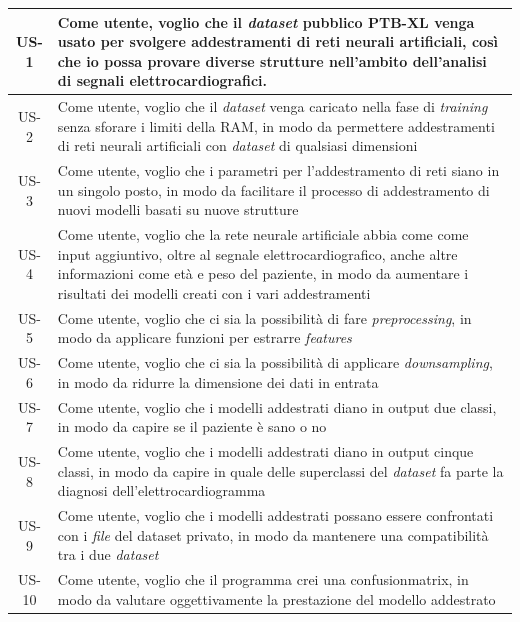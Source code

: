 \begin{center}
\begin{longtable}{|p{2.5cm}|p{10.5cm}|}
    \multicolumn{1}{|c|}{US-1} & Come utente, voglio che il \textit{dataset} pubblico PTB-XL venga usato per svolgere addestramenti di reti neurali artificiali, così che io possa provare diverse strutture nell'ambito dell'analisi di segnali elettrocardiografici. \\
    \hline
    \multicolumn{1}{|c|}{US-2} & Come utente, voglio che il \textit{dataset} venga caricato nella fase di \textit{training} senza sforare i limiti della RAM, in modo da permettere addestramenti di reti neurali artificiali con \textit{dataset} di qualsiasi dimensioni \\
    \hline
    \multicolumn{1}{|c|}{US-3} & Come utente, voglio che i parametri per l'addestramento di reti siano in un singolo posto, in modo da facilitare il processo di addestramento di nuovi modelli basati su nuove strutture \\
    \hline
    \multicolumn{1}{|c|}{US-4} & Come utente, voglio che la rete neurale artificiale abbia come come input aggiuntivo, oltre al segnale elettrocardiografico, anche altre informazioni come età e peso del paziente, in modo da aumentare i risultati dei modelli creati con i vari addestramenti \\
    \hline
    \multicolumn{1}{|c|}{US-5} & Come utente, voglio che ci sia la possibilità di fare \textit{preprocessing}, in modo da applicare funzioni per estrarre \textit{features} \\
    \hline
    \multicolumn{1}{|c|}{US-6} & Come utente, voglio che ci sia la possibilità di applicare \textit{downsampling}, in modo da ridurre la dimensione dei dati in entrata \\
    \hline
    \multicolumn{1}{|c|}{US-7} & Come utente, voglio che i modelli addestrati diano in output due classi, in modo da capire se il paziente è sano o no \\
    \hline
    \multicolumn{1}{|c|}{US-8} & Come utente, voglio che i modelli addestrati diano in output cinque classi, in modo da capire in quale delle superclassi del \textit{dataset} fa parte la diagnosi dell'elettrocardiogramma \\
    \hline
    \multicolumn{1}{|c|}{US-9} & Come utente, voglio che i modelli addestrati possano essere confrontati con i \textit{file} del dataset privato, in modo da mantenere una compatibilità tra i due \textit{dataset} \\
    \hline
    \multicolumn{1}{|c|}{US-10} & Come utente, voglio che il programma crei una \gls{confusionmatrix}, in modo da valutare oggettivamente la prestazione del modello addestrato \\

\end{longtable}
\end{center}
